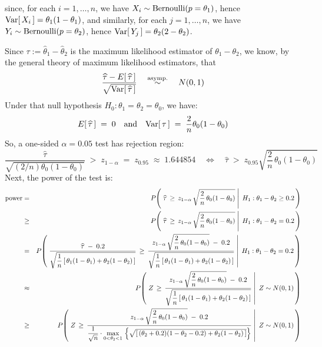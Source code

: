 since, for each $i = 1,\ldots, n$, we have $X_{i} \sim \textnormal{Bernoulli}(p = \theta_{1})$,
hence $\textnormal{Var}\!\left[\,X_{i}\,\right] = \theta_{1}(1-\theta_{1})$,
and similarly, for each $j = 1,\ldots,n$, we have $Y_{i} \sim \textnormal{Bernoulli}(p = \theta_{2})$,
hence $\textnormal{Var}\!\left[\,Y_{j}\,\right] = \theta_{2}(2-\theta_{2})$.

\vskip 0.3cm
\noindent
Since $\tau := \widehat{\theta}_{1} - \widehat{\theta}_{2}$ is the maximum likelihood estimator of $\theta_{1} - \theta_{2}$,
we know, by the general theory of maximum likelihood estimators, that
\begin{equation*}
\dfrac{\widehat{\tau} - E\!\left[\,\widehat{\tau}\,\right]}{\sqrt{\textnormal{Var}\!\left[\,\widehat{\tau}\,\right]}}
\quad\overset{\textnormal{asymp.}}{\sim}\quad
N(0,1)
\end{equation*}
Under that null hypothesis $H_{0}: \theta_{1} = \theta_{2} = \theta_{0}$, we have:
\begin{equation*}
E\!\left[\,\widehat{\tau}\,\right] \;=\; 0
\quad\textnormal{and}\quad
\textnormal{Var}\!\left[\,\tau\,\right] \;=\; \dfrac{2}{n}\theta_{0}(1-\theta_{0})
\end{equation*}
So, a one-sided $\alpha = 0.05$ test has rejection region:
\begin{equation*}
\dfrac{\widehat{\tau}}{\sqrt{(2/n)\theta_{0}(1-\theta_{0})}} \; > \; z_{1-\alpha} \; = \; z_{0.95} \;\approx\; 1.644854
\quad\Longleftrightarrow\quad
\widehat{\tau} \;>\; z_{0.95}\sqrt{\dfrac{2}{n}\,\theta_{0}(1-\theta_{0})}
\end{equation*}
Next, the power of the test is:
\begin{eqnarray*}
\textnormal{power}
&=& P\!\left(\,\left.\widehat{\tau}\,\geq\,z_{1-\alpha}\,\sqrt{\dfrac{2}{n}\,\theta_{0}(1-\theta_{0})}\;\right\vert\;H_{1}:\theta_{1} - \theta_{2} \geq 0.2\,\right)
\\
&\geq& P\!\left(\,\left.\widehat{\tau}\,\geq\,z_{1-\alpha}\,\sqrt{\dfrac{2}{n}\,\theta_{0}(1-\theta_{0})}\;\right\vert\;H_{1}:\theta_{1} - \theta_{2} = 0.2\,\right)
\\
&=& P\!\left(\,\left.\dfrac{\widehat{\tau}\;-\;0.2}{\sqrt{\dfrac{1}{n}\left[\,\theta_{1}(1-\theta_{1}) + \theta_{2}(1-\theta_{2})\,\right]}}\,\geq\,
\dfrac{z_{1-\alpha}\,\sqrt{\dfrac{2}{n}\,\theta_{0}(1-\theta_{0})}\;-\;0.2}{\sqrt{\dfrac{1}{n}\left[\,\theta_{1}(1-\theta_{1}) + \theta_{2}(1-\theta_{2})\,\right]}}
\;\right\vert\;H_{1}:\theta_{1} - \theta_{2} = 0.2\,\right)
\\
&\approx& P\!\left(\,
\left.
Z
\,\geq\,
\dfrac{z_{1-\alpha}\,\sqrt{\dfrac{2}{n}\,\theta_{0}(1-\theta_{0})}\;-\;0.2}
{\sqrt{\dfrac{1}{n}\left[\,\theta_{1}(1-\theta_{1}) + \theta_{2}(1-\theta_{2})\,\right]}}\;
\right\vert\;
Z \sim N(0,1)
\,\right)
\\
&\geq& P\!\left(\,
\left.
Z
\,\geq\,
\dfrac{z_{1-\alpha}\,\sqrt{\dfrac{2}{n}\,\theta_{0}(1-\theta_{0})}\;-\;0.2}
{\dfrac{1}{\sqrt{n}}\cdot\underset{0<\theta_{2}<1}{\max}\,\left\{\sqrt{\left[\,(\theta_{2}+0.2)(1-\theta_{2}-0.2) + \theta_{2}(1-\theta_{2})\,\right]}\right\}}\;
\right\vert\;
Z \sim N(0,1)
\,\right)
\end{eqnarray*}
